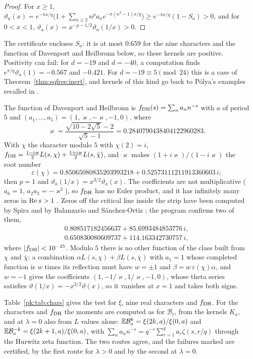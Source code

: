 \begin{proof}
For $x\ge1$, $\vartheta_a(x)=e^{-\pi x/q}\big(1+\sum_{n\ge2}n^pa_ne^{-\pi(n^2-1)x/q}\big)\ge e^{-\pi x/q}(1-S_a)>0$, and for $0<x<1$, $\vartheta_a(x)=x^{-p-1/2}\vartheta_a(1/x)>0$.
\end{proof}

The certificate encloses $S_a$: it is at most $0.659$ for the nine characters and the function of Davenport and Heilbronn below, so these kernels are positive. Positivity can fail: for $d=-19$ and $d=-40$, a computation finds $e^{\pi/q}\vartheta_a(1)=-0.567$ and $-0.421$. For $d=-19\equiv5\pmod{24}$ this is a case of Theorem~\ref{thm:sqfree:inert}, and kernels of this kind go back to P\'olya's examples recalled in \cite[Section 6.1]{BPY01}.

The function of Davenport and Heilbronn \cite{DH36} is $f_{\rm DH}(s)=\sum_na_nn^{-s}$ with $a$ of period $5$ and $(a_1,\dots,a_5)=(1,\varkappa,-\varkappa,-1,0)$, where
\[
\varkappa=\frac{\sqrt{10-2\sqrt5}-2}{\sqrt5-1}=0.2840790438404122960283.
\]
With $\chi$ the character modulo $5$ with $\chi(2)=i$, $f_{\rm DH}=\frac{1-i\varkappa}2L(s,\chi)+\frac{1+i\varkappa}2L(s,\bar\chi)$, and $\varkappa$ makes $(1+i\varkappa)/(1-i\varkappa)$ the root number
\[
\varepsilon(\chi)=0.85065080835203993218+0.52573111211913360603\,i;
\]
then $p=1$ and $\vartheta_a(1/x)=x^{3/2}\vartheta_a(x)$. The coefficients are not multiplicative ($a_6=1$, $a_2a_3=-\varkappa^2$), so $f_{\rm DH}$ has no Euler product, and it has infinitely many zeros in $\operatorname{Re} s>1$ \cite[Chapter 10]{Titchmarsh}. Zeros off the critical line inside the strip have been computed by Spira \cite{Spira94} and by Balanzario and S\'anchez-Ortiz \cite{BSO07}; the program confirms two of them,
\begin{gather*}
0.808517182456637+85.6993484853776\,i,\\
0.650830080609737+114.163342730757\,i,
\end{gather*}
where $|f_{\rm DH}|<10^{-25}$. Modulo $5$ there is no other function of the class built from $\chi$ and $\bar\chi$: a combination $\alpha L(s,\chi)+\beta L(s,\bar\chi)$ with $a_1=1$ whose completed function is $w$ times its reflection must have $w=\pm1$ and $\beta=w\,\varepsilon(\chi)\alpha$, and $w=-1$ gives the coefficients $(1,-1/\varkappa,1/\varkappa,-1,0)$, whose theta series satisfies $\vartheta(1/x)=-x^{3/2}\vartheta(x)$, so it vanishes at $x=1$ and takes both signs.

Table~\ref{pk:tab:chars} gives the test for $\xi$, nine real characters and $f_{\rm DH}$. For the characters and $f_{\rm DH}$ the moments are computed as for $\mathcal B_t$, from the kernels $K_a$, and at $\lambda=0$ also from $L$ values alone: $\mathbb{E}\mathcal B_a^k=\xi(2k,a)/\xi(0,a)$ and $\mathbb{E}\mathcal B_a^{-k}=\xi(2k+1,a)/\xi(0,a)$, with $\sum_na_nn^{-s}=q^{-s}\sum_{r=1}^qa_r\zeta(s,r/q)$ through the Hurwitz zeta function. The two routes agree, and the failures marked are certified, by the first route for $\lambda>0$ and by the second at $\lambda=0$.

